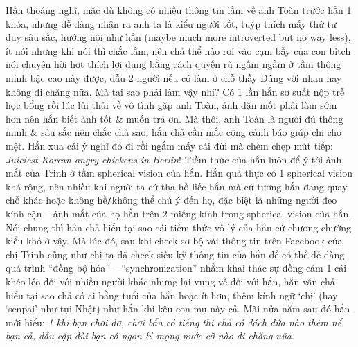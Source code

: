 \documentclass[12pt,twoside]{book}
\begin{document}
Hắn thoáng nghĩ, mặc dù không có nhiều thông tin lắm về anh Toàn trước hắn 1 khóa, nhưng dễ dàng nhận ra anh ta là kiểu người tốt, tuýp thích mấy thứ tư duy sâu sắc, hướng nội như hắn (maybe much more introverted but no way less), ít nói nhưng khi nói thì chắc lắm, nên chả thể nào rơi vào cạm bẫy của con bitch nói chuyện hời hợt thích lợi dụng bằng cách quyến rũ ngấm ngầm ở tầm thông minh bậc cao này được, dẫu 2 người nếu có làm ở chỗ thầy {\sf Dũng} với nhau hay không đi chăng nữa. Mà tại sao phải làm vậy nhỉ? Có 1 lần hắn sơ suất nộp trễ học bổng rồi lúc lủi thủi về vô tình gặp anh Toàn, ảnh dặn mốt phải làm sớm hơn nên hắn biết ảnh tốt \& muốn trả ơn. Mà thôi, anh Toàn là người đủ thông minh \& sâu sắc nên chắc chả sao, hắn chả cần mắc công cảnh báo giúp chi cho mệt. Hắn xua cái ý nghĩ đó đi rồi ngắm mấy cái đùi mà chèm chẹp mút tiếp: {\it Juiciest Korean angry chickens in Berlin}! Tiềm thức của hắn luôn để ý tới ánh mắt của Trinh ở tầm spherical vision của hắn. Hắn quả thực có 1 spherical vision khá rộng, nên nhiều khi người ta cứ tha hồ liếc hắn mà cứ tưởng hắn đang quay chỗ khác hoặc không hề{\tt/}không thể chú ý đến họ, đặc biệt là những người đeo kính cận -- ánh mắt của họ hằn trên 2 miếng kính trong spherical vision của hắn. Nói chung thì hắn chả hiểu tại sao cái tiềm thức vô lý của hắn cứ chương chướng kiểu khó ở vậy. Mà lúc đó, sau khi check sơ bộ vài thông tin trên Facebook của chị Trinh cũng như chị ta đã check siêu kỹ thông tin của hắn để có thể dễ dàng quá trình ``đồng bộ hóa'' -- ``synchronization'' nhằm khai thác sự đồng cảm 1 cái khéo léo đối với nhiều người khác nhưng lại vụng về đối với hắn, hắn vẫn chả hiểu tại sao chả có ai bằng tuổi của hắn hoặc ít hơn, thêm kính ngữ `chị' (hay `senpai' như tụi Nhật) như hắn khi kêu con mụ này cả. Mãi nửa năm sau đó hắn mới hiểu: {\it 1 khi bạn chơi dơ, chơi bẩn có tiếng thì chả có đách đứa nào thèm nể bạn cả, dẫu cặp đùi bạn có ngon \& mọng nước cỡ nào đi chăng nữa}.
\end{document}
